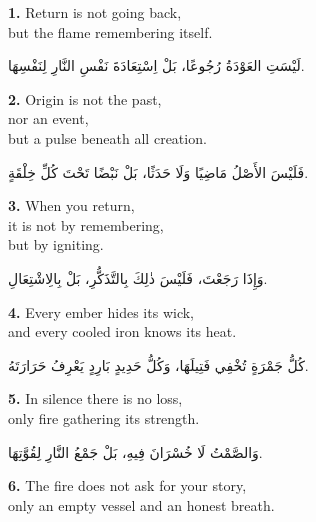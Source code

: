 \documentclass[11pt,a4paper,twoside]{book}
\begin{document}
{\color{indigo}\bfseries 1.}\quad
Return is not going back,\\
but the flame remembering itself.

\begin{flushright}
{\arabicfont
لَيْسَتِ العَوْدَةُ رُجُوعًا،
بَلْ اِسْتِعَادَةَ نَفْسِ النَّارِ لِنَفْسِهَا.}
\end{flushright}

\vspace{1em}
{\color{indigo}\bfseries 2.}\quad
Origin is not the past,\\
nor an event,\\
but a pulse beneath all creation.

\begin{flushright}
{\arabicfont
فَلَيْسَ الأَصْلُ مَاضِيًا
وَلَا حَدَثًا،
بَلْ نَبْضًا تَحْتَ كُلِّ خِلْقَةٍ.}
\end{flushright}

\vspace{1em}
{\color{indigo}\bfseries 3.}\quad
When you return,\\
it is not by remembering,\\
but by igniting.

\begin{flushright}
{\arabicfont
وَإِذَا رَجَعْتَ،
فَلَيْسَ ذٰلِكَ بِالتَّذَكُّرِ،
بَلْ بِالِاشْتِعَالِ.}
\end{flushright}

\vspace{1em}
{\color{indigo}\bfseries 4.}\quad
Every ember hides its wick,\\
and every cooled iron knows its heat.

\begin{flushright}
{\arabicfont
كُلُّ جَمْرَةٍ تُخْفِي فَتِيلَهَا،
وَكُلُّ حَدِيدٍ بَارِدٍ يَعْرِفُ حَرَارَتَهُ.}
\end{flushright}

\vspace{1em}
{\color{indigo}\bfseries 5.}\quad
In silence there is no loss,\\
only fire gathering its strength.

\begin{flushright}
{\arabicfont
وَالصَّمْتُ لَا خُسْرَانَ فِيهِ،
بَلْ جَمْعُ النَّارِ لِقُوَّتِهَا.}
\end{flushright}

\vspace{1em}
{\color{indigo}\bfseries 6.}\quad
The fire does not ask for your story,\\
only an empty vessel and an honest breath.
\end{document}
